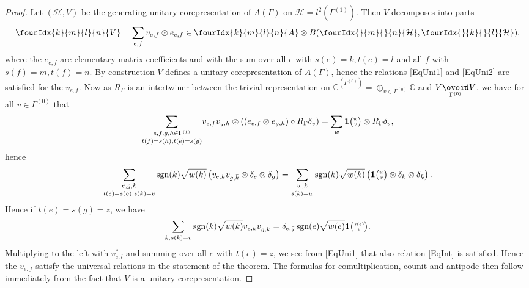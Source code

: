 \documentclass[10pt]{article}
\DeclareMathOperator{\sgn}{\mathrm{sgn}}
\newcommand{\Circtv}[1]{\underset{#1}{\mathop{\ooalign{$\ovoid$\cr\hidewidth\raise-.05ex\hbox{$\scriptstyle\mathsf T\mkern3.5mu$}\cr}}}} %
\newcommand{\C}{\mathbb{C}}
\newcommand{\Hsp}{\mathcal{H}}
\newcommand{\Grt}[3]{#1{\tiny {\begin{pmatrix} #2\\#3\end{pmatrix}}}}
\newcommand{\UnitC}[2]{\Grt{\mathbf{1}}{#1}{#2}}
\newcommand{\Gr}[5]{\fourIdx{#2}{#4}{#3}{#5}{#1}}%
\newcommand{\Gru}[3]{\Gr{#1}{}{}{#2}{#3}}
\theoremstyle{definition}
\numberwithin{equation}{section}
\begin{document}
\begin{proof} Let $(\Hsp,V)$ be the generating unitary corepresentation of $A(\Gamma)$ on $\Hsp = l^2(\Gamma^{(1)})$. Then $V$ decomposes into parts \[ \Gr{V}{k}{l}{m}{n} = \sum_{e,f} v_{e,f} \otimes e_{e,f} \in \Gr{A}{k}{l}{m}{n}\otimes B(\Gru{\Hsp}{m}{n},\Gru{\Hsp}{k}{l}),\] where the $e_{e,f}$ are elementary matrix coefficients and with the sum over all $e$ with $s(e)=k,t(e)=l$ and all $f$ with $s(f) = m, t(f)=n$. By construction $V$ defines a unitary corepresentation of $A(\Gamma)$, hence the relations \eqref{EqUni1} and \eqref{EqUni2} are satisfied for the $v_{e,f}$. Now as $R_{\Gamma}$ is an intertwiner between the trivial representation on $\C^{(\Gamma^{(0)})} = \oplus_{v\in \Gamma^{(0)}} \C$ and $V\Circtv{\Gamma^{(0)}} V$, we have for all $v\in \Gamma^{(0)}$ that \begin{equation}\label{EqMorR}\underset{t(f)=s(h),t(e)=s(g)}{\sum_{e,f,g,h\in \Gamma^{(1)}}} v_{e,f}v_{g,h}\otimes \left((e_{e,f}\otimes e_{g,h})\circ R_{\Gamma} \delta_v\right) = \sum_w \UnitC{w}{v}\otimes R_{\Gamma}\delta_v,\end{equation} hence
\[\underset{t(e)=s(g),s(k)=v}{\sum_{e,g,k}} \sgn(k)\sqrt{w(k)}\left( v_{e,k}v_{g,\bar{k}} \otimes \delta_e\otimes \delta_{g}\right) =\underset{s(k)=w}{\sum_{w,k}}\sgn(k)\sqrt{w(k)} \left(\UnitC{w}{v} \otimes \delta_k\otimes \delta_{\bar{k}}\right).\] Hence if $t(e) = s(g)=z$, we have \[\sum_{k,s(k)=v} \sgn(k)\sqrt{w(k)} v_{e,k}v_{g,\bar{k}} =  \delta_{e,\bar{g}} \sgn(e)\sqrt{w(e)}\UnitC{s(e)}{v}.\] Multiplying to the left with $v_{e,l}^*$ and summing over all $e$ with $t(e) = z$, we see from \eqref{EqUni1} that also relation \eqref{EqInt} is satisfied. Hence the $v_{e,f}$ satisfy the universal relations in the statement of the theorem. The formulas for comultiplication, counit and antipode then follow immediately from the fact that $V$ is a unitary corepresentation.


\end{proof}
\end{document}
